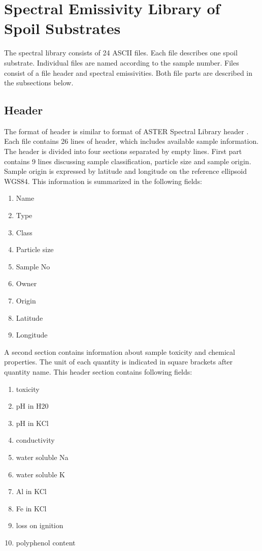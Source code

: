 \chapter{Spectral Emissivity Library of Spoil Substrates}
\label{app:Library}

The spectral library consists of 24 ASCII files. Each file describes one spoil substrate. Individual files are named according to the sample number. Files consist of a file header and spectral emissivities. Both file parts are described in the subsections below.

\section{Header}

The format of header is similar to format of ASTER Spectral Library header \cite{BH09}. Each file contains 26 lines of header, which includes available sample information. The header is divided into four sections separated by empty lines. First part contains 9 lines discussing sample classification, particle size and sample origin. Sample origin is expressed by latitude and longitude on the reference ellipsoid WGS84. This information is summarized in the following fields:

\begin{enumerate}
	\item	Name
	\item Type
	\item Class
	\item Particle size
	\item Sample No
	\item Owner
	\item Origin
	\item Latitude
	\item Longitude
\end{enumerate}

A second section contains information about sample toxicity and chemical properties. The unit of each quantity is indicated in square brackets after quantity name. This header section contains following fields:

\begin{enumerate}
	\item toxicity
	\item pH in H20
	\item pH in KCl
	\item conductivity
	\item water soluble Na
	\item water soluble K
	\item Al in KCl
	\item Fe in KCl
	\item loss on ignition
	\item polyphenol content
\end{enumerate}

